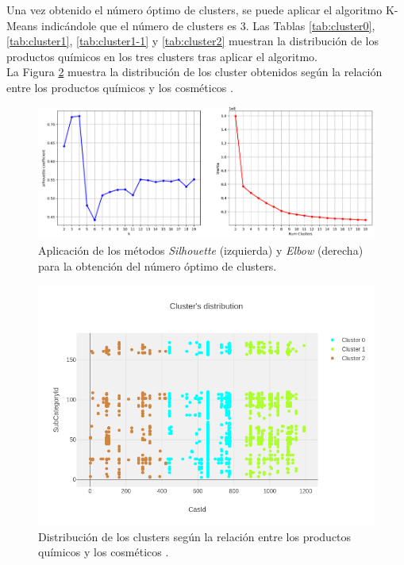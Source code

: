 Una vez obtenido el número óptimo de clusters, se puede aplicar el algoritmo K-Means indicándole que el número de clusters es 3. Las Tablas \ref{tab:cluster0}, \ref{tab:cluster1}, \ref{tab:cluster1-1} y \ref{tab:cluster2} muestran la distribución de los productos químicos en los tres clusters tras aplicar el algoritmo. \\

La Figura \ref{fig:clusters-distribution} muestra la distribución de los cluster obtenidos según la relación entre los productos químicos  y los cosméticos .

\newpage
\begin{figure}[!th]
\includegraphics[scale=0.45]{figures/silhouette-elbow-methods}
\centering
\caption{Aplicación de los métodos \textit{Silhouette} (izquierda) y \textit{Elbow} (derecha) para la obtención del número óptimo de clusters.}
\label{fig:silhouette-elbow-methods}
\end{figure}

\begin{figure}[!th]
\includegraphics[scale=0.55]{figures/clusters-distribution}
\centering
\caption{Distribución de los clusters según la relación entre los productos químicos  y los cosméticos .}
\label{fig:clusters-distribution}
\end{figure}




